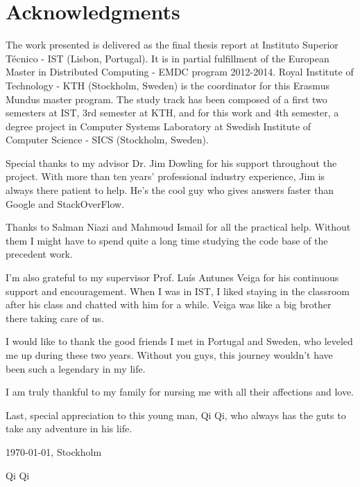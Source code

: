 \chapter*{Acknowledgments}
\thispagestyle{empty}


The work presented is delivered as the final thesis report at Instituto Superior Técnico - IST (Lisbon, Portugal). It is in partial fulfillment of the European Master in Distributed Computing - EMDC program 2012-2014. Royal Institute of Technology - KTH (Stockholm, Sweden) is the coordinator for this Erasmus Mundus master program. The study track has been composed of a first two semesters at IST, 3rd semester at KTH, and for this work and 4th semester, a degree project in Computer Systems Laboratory at Swedish Institute of Computer Science - SICS (Stockholm, Sweden).

\noindent Special thanks to my advisor Dr. Jim Dowling for his support throughout the project. With more than ten years' professional industry experience, Jim is always there patient to help. He's the cool guy who gives answers faster than Google and StackOverFlow.

\noindent Thanks to Salman Niazi and Mahmoud Ismail for all the practical help. Without them I might have to spend quite a long time studying the code base of the precedent work. 

\noindent I'm also grateful to my supervisor Prof. Luís Antunes Veiga for his continuous support and encouragement. When I was in IST, I liked staying in the classroom after his class and chatted with him for a while. Veiga was like a big brother there taking care of us.

\noindent I would like to thank the good friends I met in Portugal and Sweden, who leveled me up during these two years. Without you guys, this journey wouldn't have been such a legendary in my life.

\noindent I am truly thankful to my family for nursing me with all their affections and love.

\noindent Last, special appreciation to this young man, Qi Qi, who always has the guts to take any adventure in his life.

\vfill
\begin{flushright}
  \begin{minipage}{8cm}
    \begin{center}
      \today, Stockholm

      Qi Qi
    \end{center}
  \end{minipage}
\end{flushright}

